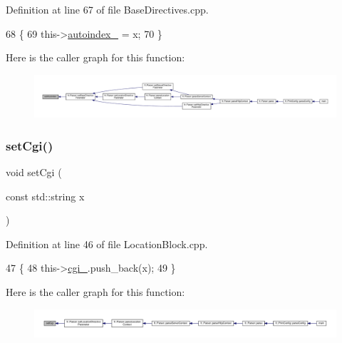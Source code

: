Definition at line 67 of file Base\+Directives.\+cpp.


\begin{DoxyCode}
68     \{
69         this->\hyperlink{classft_1_1_base_directives_a4ebffbe32f50a462afa139c6f03c1a4f}{autoindex\_} = x;
70     \}
\end{DoxyCode}
Here is the caller graph for this function\+:
\nopagebreak
\begin{figure}[H]
\begin{center}
\leavevmode
\includegraphics[width=350pt]{classft_1_1_base_directives_ae7293c7bbf34e9bdc60c540dccd53342_icgraph}
\end{center}
\end{figure}
\mbox{\label{classft_1_1_location_block_a925a8d17e78d0cdea1b660e46e7be203}} 
\subsubsection{\texorpdfstring{set\+Cgi()}{setCgi()}}
{\footnotesize\ttfamily void set\+Cgi (\begin{DoxyParamCaption}\item[{const std\+::string}]{x }\end{DoxyParamCaption})}



Definition at line 46 of file Location\+Block.\+cpp.


\begin{DoxyCode}
47     \{
48         this->\hyperlink{classft_1_1_location_block_a1952859864bec449ee1a20b4e90f829a}{cgi\_}.push\_back(x);
49     \}
\end{DoxyCode}
Here is the caller graph for this function\+:
\nopagebreak
\begin{figure}[H]
\begin{center}
\leavevmode
\includegraphics[width=350pt]{classft_1_1_location_block_a925a8d17e78d0cdea1b660e46e7be203_icgraph}
\end{center}
\end{figure}
\mbox{\label{classft_1_1_location_block_a25189c8c38f0b9ec831bb1b5295669c3}} 
